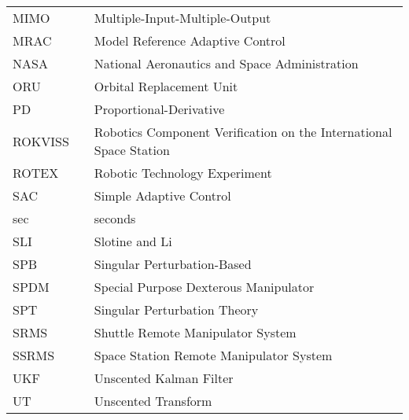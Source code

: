 \begin{longtable}[ht]{lll}
			MIMO    &  & Multiple-Input-Multiple-Output\\
			MRAC		&  & Model Reference Adaptive Control\\
			NASA 		&  & National Aeronautics and Space Administration\\
			ORU     &  & Orbital Replacement Unit\\
			PD			&	 & Proportional-Derivative\\
			ROKVISS &  & Robotics Component Verification on the International Space 	Station\\
			ROTEX		&  & Robotic Technology Experiment\\
			SAC			&  & Simple Adaptive Control\\
			sec			&  & seconds\\
			SLI			&  & Slotine and Li\\
			SPB			&  & Singular Perturbation-Based\\
			SPDM 		&  & Special Purpose Dexterous Manipulator\\
      SPT     &  & Singular Perturbation Theory\\
			SRMS 		&  & Shuttle Remote Manipulator System\\
			SSRMS		&  & Space Station Remote Manipulator System\\
			UKF			&  & Unscented Kalman Filter\\
			UT			&  & Unscented Transform\\
\end{longtable}

			